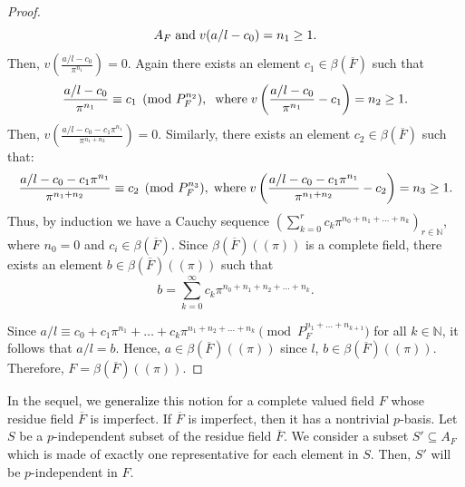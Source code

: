 \documentclass[times,10pt]{amsart}
\newcommand{\N}{\ensuremath{\mathbb{N}}}
\begin{document}
{\begin{proof}
$$A_F \hspace{1mm}\text{and}\hspace{1mm}  v( a/l-c_0)=n_1\geq 1.$$  Then, $ v\left(\frac{a/l-c_0}{\pi^{n_1}}\right)=0.$  Again there exists an element  $ c_1\in \beta(\overline{F})$  such that$$ \frac{ a/l-c_0}{\pi^{n_1}}\equiv c_1\pmod{P_F^{n_2}}, \hspace{2mm} \text{where}\hspace{1mm} v\left( \frac{a/l-c_0}{\pi^{n_1}}-c_1\right)= n_2\geq 1. $$  Then, $  v\displaystyle{\left( \frac{a/l-c_0-c_1\pi^{n_1}}{\pi^{n_1+n_2}}\right)}=0$.  Similarly, there exists an element $c_2\in \beta(\overline{F})$ such that:$$  \frac{a/l-c_0-c_1\pi^{n_1}}{\pi^{n_1+n_2}}\equiv c_2\pmod{P_F^{n_3}},\hspace{1mm} \text{where}\hspace{1mm} v\left( \frac{a/l-c_0-c_1\pi^{n_1}}{\pi^{n_1+n_2}}-c_2\right)=n_3\geq 1.$$ 
Thus, by induction  we have a  Cauchy sequence $ \left(\sum\limits_{k=0}^{r} c_k\pi^{n_0+n_1+\ldots+n_k}\right)_{r\in \N}$, where $n_0=0$ and $c_i\in \beta(\overline{F})$.
 Since $ \beta(\overline{F})((\pi))   $ is a complete field,  there exists an 
element $b\in \beta(\overline{F})((\pi))$ such that $$b= \sum_{k=0}^{\infty} c_k\pi^{n_0+n_1+n_2+\ldots+n_k}.$$

Since $a/l  \equiv c_0+ c_1\pi^{n_1}+\ldots + c_k\pi^{n_1+n_2+\ldots +n_k}\pmod{ {P_F^{n_1+\ldots+n_{k+1}}}}$ for all $k\in \N$, it follows that  $a/l=b$. Hence, $a\in \beta(\overline{F})((\pi))$ since $l$, $b\in \beta(\overline{F})((\pi))$. Therefore, $F=\beta(\overline{F})((\pi))$.
\end{proof}
\vspace{2mm}

In the sequel, we  \textcolor{black}{generalize} this notion for a complete valued  field $F$ whose residue field $\overline{F}$ is  imperfect.
 If $\overline{F}$ is  imperfect, then it has a nontrivial $p$-basis. Let $ S$ be a  $p$-independent subset of the residue   field $\overline{F}$.  We consider a subset $S'\subseteq A_F$ which is made of exactly one representative for each element in $S.$  Then, $S'$ will be $p$-independent in $F$.
  
}
\end{document}
